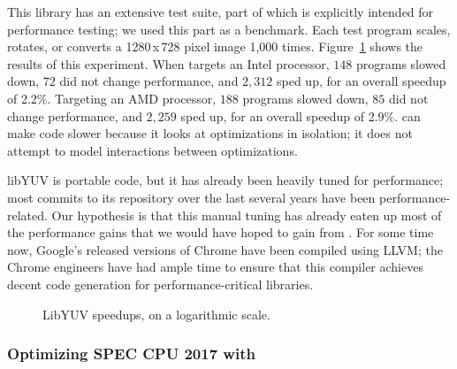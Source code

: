 This library has an extensive test suite, part of which is explicitly
intended for performance testing; we used this part as a benchmark.
%
Each test program scales, rotates, or converts a 1280\,x\,728 pixel
image 1,000 times.
%
Figure~\ref{fig:yuv} shows the results of this experiment.
%
When \minotaur{} targets an Intel processor, $148$ programs slowed down, $72$
did not change performance, and $2,312$ sped up, for an overall speedup of
2.2\%.
%
Targeting an AMD processor, $188$ programs slowed down, $85$ did not
change performance, and $2,259$ sped up, for an overall speedup of 2.9\%.
%
\minotaur{} can make code slower because it looks at optimizations in
isolation; it does not attempt to model interactions between
optimizations.


libYUV is portable code, but it has already been heavily tuned for
performance; most commits to its repository over the last several
years have been performance-related.
%
Our hypothesis is that this manual tuning has already eaten up most of
the performance gains that we would have hoped to gain from \minotaur{}.
%
For some time now, Google's released versions of Chrome have been
compiled using LLVM; the Chrome engineers have had ample time to
ensure that this compiler achieves decent code generation for
performance-critical libraries.
\begin{figure}[tbp]
  \centering
  \hfill
  \caption{LibYUV speedups, on a logarithmic scale.}
  \label{fig:yuv}
\end{figure}




\subsubsection{Optimizing SPEC CPU 2017 with \minotaur{}}

